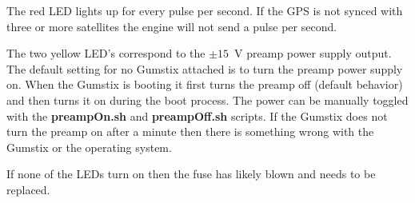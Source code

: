 The red LED lights up for every pulse per second.
If the GPS is not synced with three or more satellites the engine will not send a pulse per second.

The two yellow LED's correspond to the $\pm15$~V preamp power supply output.
The default setting for no Gumstix attached is to turn the preamp power supply on.
When the Gumstix is booting it first turns the preamp off (default behavior) and then turns it on during the boot process.
The power can be manually toggled with the {\bf preampOn.sh} and {\bf preampOff.sh} scripts.
If the Gumstix does not turn the preamp on after a minute then there is something wrong with the Gumstix or the operating system.

If none of the LEDs turn on then the fuse has likely blown and needs to be replaced.

